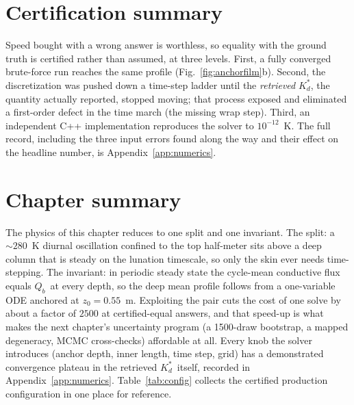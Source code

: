 \documentclass[11pt,a4paper,oneside]{report}
\newcommand{\Kds}{\ensuremath{K_d^{*}}}
\newcommand{\Qb}{\ensuremath{Q_b}}
\begin{document}
\section{Certification summary}\label{sec:certsummary}
Speed bought with a wrong answer is worthless, so equality with the
ground truth is certified rather than assumed, at three levels.
First, a fully converged brute-force run reaches the same profile
(Fig.~\ref{fig:anchorfilm}b). Second, the discretization was pushed
down a time-step ladder until the \emph{retrieved} \Kds, the quantity
actually reported, stopped moving; that process exposed and
eliminated a first-order defect in the time march (the missing wrap
step). Third, an independent C++ implementation reproduces the solver
to $10^{-12}$~K. The full record, including the three input errors
found along the way and their effect on the headline number, is
Appendix~\ref{app:numerics}.

\section*{Chapter summary}
The physics of this chapter reduces to one split and one invariant.
The split: a ${\sim}280$~K diurnal oscillation confined to the top
half-meter sits above a deep column that is steady on the lunation
timescale, so only the skin ever needs time-stepping. The invariant:
in periodic steady state the cycle-mean conductive flux equals \Qb\
at every depth, so the deep mean profile follows from a one-variable
ODE anchored at $z_0=0.55$~m. Exploiting the pair cuts the cost of one
solve by about a factor of $2500$ at certified-equal answers, and that
speed-up is what makes the next chapter's uncertainty program (a
1500-draw bootstrap, a mapped degeneracy, MCMC cross-checks)
affordable at all. Every
knob the solver introduces (anchor depth, inner length, time step,
grid) has a demonstrated convergence plateau in the retrieved \Kds\
itself, recorded in Appendix~\ref{app:numerics}.
Table~\ref{tab:config} collects the certified production
configuration in one place for reference.
\end{document}
